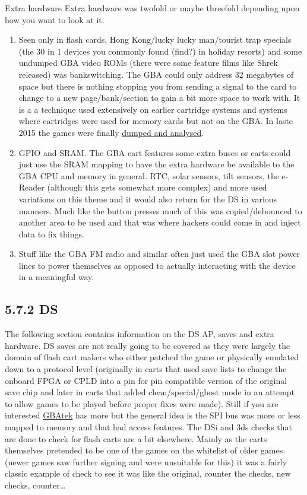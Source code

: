 \documentclass[
]{book}
\providecommand{\tightlist}{%
  \setlength{\itemsep}{0pt}\setlength{\parskip}{0pt}}
\begin{document}
Extra hardware Extra hardware was twofold or maybe threefold depending upon how you want to look at it.

\begin{enumerate}
\def\labelenumi{\arabic{enumi}.}
\tightlist
\item
  Seen only in flash cards, Hong Kong/lucky lucky man/tourist trap specials (the 30 in 1 devices you commonly found (find?) in holiday resorts) and some undumped GBA video ROMs (there were some feature films like Shrek released) was bankswitching. The GBA could only address 32 megabytes of space but there is nothing stopping you from sending a signal to the card to change to a new page/bank/section to gain a bit more space to work with. It is a a technique used extensively on earlier cartridge systems and systems where cartridges were used for memory cards but not on the GBA. In laste 2015 the games were finally \href{https://mgba.io/2015/10/20/dumping-the-undumped/}{dumped and analysed}.
\item
  GPIO and SRAM. The GBA cart features some extra buses or carts could just use the SRAM mapping to have the extra hardware be available to the GBA CPU and memory in general. RTC, solar sensors, tilt sensors, the e-Reader (although this gets somewhat more complex) and more used variations on this theme and it would also return for the DS in various manners. Much like the button presses much of this was copied/debounced to another area to be used and that was where hackers could come in and inject data to fix things.
\item
  Stuff like the GBA FM radio and similar often just used the GBA slot power lines to power themselves as opposed to actually interacting with the device in a meaningful way.
\end{enumerate}

\hypertarget{ds-2}{%
\subsection{5.7.2 DS}\label{ds-2}}

The following section contains information on the DS AP, saves and extra hardware. DS saves are not really going to be covered as they were largely the domain of flash cart makers who either patched the game or physically emulated down to a protocol level (originally in carts that used save lists to change the onboard FPGA or CPLD into a pin for pin compatible version of the original save chip and later in carts that added clean/special/ghost mode in an attempt to allow games to be played before proper fixes were made). Still if you are interested \href{http://problemkaputt.de/gbatek.htm\#dscartridgebackup}{GBAtek} has more but the general idea is the SPI bus was more or less mapped to memory and that had access features. The DSi and 3ds checks that are done to check for flash carts are a bit elsewhere. Mainly as the carts themselves pretended to be one of the games on the whitelist of older games (newer games saw further signing and were unsuitable for this) it was a fairly classic example of check to see it was like the original, counter the checks, new checks, counter\ldots{}
\end{document}
